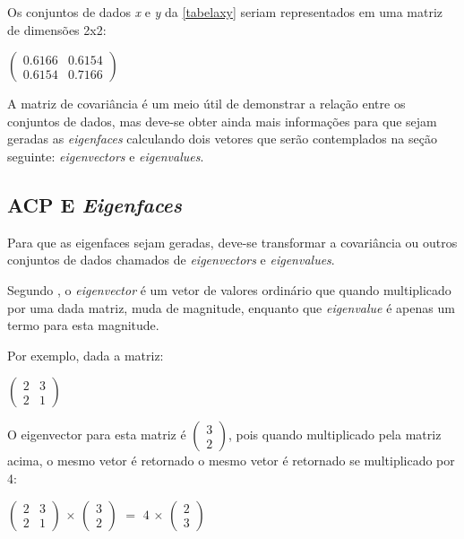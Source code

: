 Os conjuntos de dados \textit{x} e \textit{y} da \autoref{tabelaxy} seriam representados em uma matriz de dimensões 2x2:

\begin{center}
	$\begin{pmatrix} 0.6166 & 0.6154 \\ 0.6154 & 0.7166 \end{pmatrix}$
\end{center}


A matriz de covariância é um meio útil de demonstrar a relação entre os conjuntos de dados, mas deve-se obter ainda mais informações para que sejam geradas as \textit{eigenfaces} calculando dois vetores que serão contemplados na seção seguinte: \textit{eigenvectors} e \textit{eigenvalues}.

\subsection{ACP E \textit{Eigenfaces}}\label{subsec:acp-eigen}

Para que as eigenfaces sejam geradas, deve-se transformar a covariância ou outros conjuntos de dados chamados de \textit{eigenvectors} e \textit{eigenvalues}.

Segundo \cite{drmathew_java_programming}, o \textit{eigenvector} é um vetor de valores ordinário que quando multiplicado por uma dada matriz, muda de magnitude, enquanto que \textit{eigenvalue} é apenas um termo para esta magnitude. 

Por exemplo, dada a matriz:

\begin{center}
	$\begin{pmatrix} 2 & 3 \\ 2 & 1 \end{pmatrix}$
\end{center}

O eigenvector para esta matriz é $\begin{pmatrix} 3 \\ 2\end{pmatrix}$, pois quando multiplicado pela matriz acima, o mesmo vetor é retornado o mesmo vetor é retornado se multiplicado por 4:

\begin{center}
	$\begin{pmatrix} 2 & 3 \\ 2 & 1 \end{pmatrix}$ $\times$ $\begin{pmatrix} 3 \\ 2 \end{pmatrix}$ $=$ $4$ $\times$ $\begin{pmatrix} 2 \\ 3\end{pmatrix}$
\end{center}

